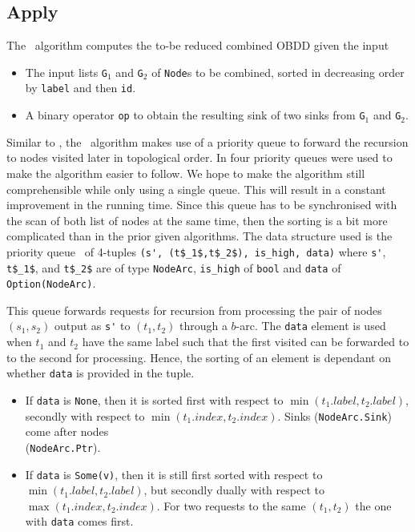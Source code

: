 \subsection{Apply} \label{sec:theory__apply}
The \Apply\ algorithm computes the to-be reduced combined OBDD given the input
\begin{itemize}
\item The input lists \lstinline{G}$_1$ and \lstinline{G}$_2$ of
  \lstinline{Node}s to be combined, sorted in decreasing order by
  \lstinline{label} and then \lstinline{id}.

\item A binary operator \lstinline{op} to obtain the resulting sink of two sinks
  from \lstinline{G}$_1$ and \lstinline{G}$_2$.
\end{itemize}

Similar to \Restrict, the \Apply\ algorithm makes use of a priority queue to
forward the recursion to nodes visited later in topological order. In
\cite{Arge96} four priority queues were used to make the algorithm easier to
follow. We hope to make the algorithm still comprehensible while only using a
single queue. This will result in a constant improvement in the running time.
Since this queue has to be synchronised with the scan of both list of nodes at
the same time, then the sorting is a bit more complicated than in the prior
given algorithms. The data structure used is the priority queue \ApplyQrec\ of
4-tuples \lstinline{(s', (t$_1$,t$_2$), is_high, data)} where \lstinline{s'},
\lstinline{t$_1$}, and \lstinline{t$_2$} are of type \lstinline{NodeArc},
\lstinline{is_high} of \lstinline{bool} and \lstinline{data} of
\lstinline{Option(NodeArc)}.

\newpage
This queue forwards requests for recursion from processing the pair of nodes
$(s_1, s_2)$ output as \lstinline{s'} to $(t_1,t_2)$ through a $b$-arc. The
\lstinline{data} element is used when $t_1$ and $t_2$ have the same label such
that the first visited can be forwarded to to the second for processing. Hence,
the sorting of an element is dependant on whether \lstinline{data} is provided
in the tuple.

\begin{itemize}
\item If \lstinline{data} is \lstinline{None}, then it is sorted first with
  respect to $\min(t_1.\mathit{label},t_2.\mathit{label})$, secondly with respect
  to $\min(t_1.\mathit{index},t_2.\mathit{index})$. Sinks
  (\lstinline{NodeArc.Sink}) come after nodes\\(\lstinline{NodeArc.Ptr}).

\item If \lstinline{data} is \lstinline{Some(v)}, then it is still first
  sorted with respect to $\min(t_1.\mathit{label},t_2.\mathit{label})$, but
  secondly dually with respect to $\max(t_1.\mathit{index}, t_2.\mathit{index})$.
  For two requests to the same $(t_1,t_2)$ the one with \lstinline{data} comes
  first.
\end{itemize}

